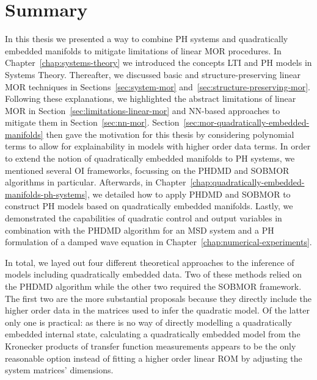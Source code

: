 \chapter{Summary}\label{chap:summary}



In this thesis we presented a way to combine \ac{PH} systems and quadratically embedded manifolds to mitigate limitations of linear \ac{MOR} procedures.
In Chapter~\ref{chap:systems-theory} we introduced the concepts \ac{LTI} and \ac{PH} models in Systems Theory.
Thereafter, we discussed basic and structure-preserving linear \ac{MOR} techniques in Sections~\ref{sec:system-mor} and~\ref{sec:structure-preserving-mor}.
Following these explanations, we highlighted the abstract limitations of linear \ac{MOR} in Section~\ref{sec:limitations-linear-mor} and \ac{NN}-based approaches to mitigate them in Section~\ref{sec:nn-mor}.
Section~\ref{sec:mor-quadratically-embedded-manifolds} then gave the motivation for this thesis by considering polynomial terms to allow for explainability in models with higher order data terms.
In order to extend the notion of quadratically embedded manifolds to \ac{PH} systems, we mentioned several \ac{OI} frameworks, focussing on the \ac{PHDMD} and \ac{SOBMOR} algorithms in particular.
Afterwards, in Chapter~\ref{chap:quadratically-embedded-manifolds-ph-systems}, we detailed how to apply \ac{PHDMD} and \ac{SOBMOR} to construct \ac{PH} models based on quadratically embedded manifolds.
Lastly, we demonstrated the capabilities of quadratic control and output variables in combination with the \ac{PHDMD} algorithm for an \ac{MSD} system and a \ac{PH} formulation of a damped wave equation in Chapter~\ref{chap:numerical-experiments}.


In total, we layed out four different theoretical approaches to the inference of models including quadratically embedded data.
Two of these methods relied on the \ac{PHDMD} algorithm while the other two required the \ac{SOBMOR} framework.
The first two are the more substantial proposals because they directly include the higher order data in the matrices used to infer the quadratic model.
Of the latter only one is practical: as there is no way of directly modelling a quadratically embedded internal state, calculating a quadratically embedded model from the Kronecker products of transfer function measurements appears to be the only reasonable option instead of fitting a higher order linear \ac{ROM} by adjusting the system matrices' dimensions.

